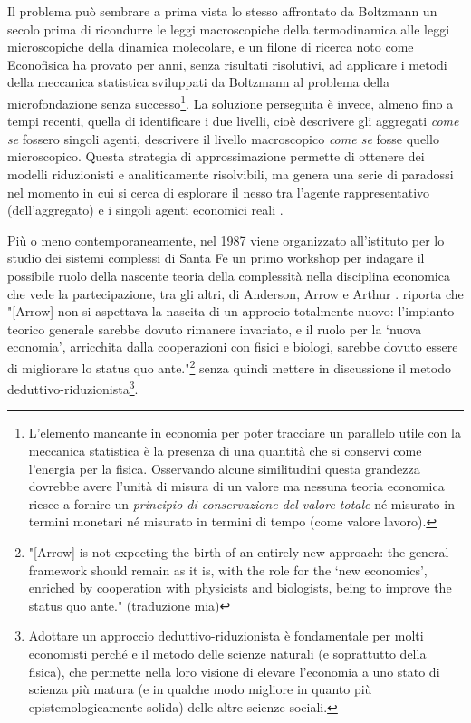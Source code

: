 \documentclass[a4paper, headings=standardclasses]{scrartcl}
\begin{document}
Il problema può sembrare a prima vista lo stesso affrontato da Boltzmann un secolo prima di ricondurre le leggi macroscopiche della termodinamica alle leggi microscopiche della dinamica molecolare, e un filone di ricerca noto come Econofisica ha provato per anni, senza risultati risolutivi, ad applicare i metodi della meccanica statistica sviluppati da Boltzmann al problema della microfondazione senza successo\footnote{L'elemento mancante in economia per poter tracciare un parallelo utile con la meccanica statistica è la presenza di una quantità che si conservi come l'energia per la fisica. Osservando alcune similitudini questa grandezza dovrebbe avere l'unità di misura di un valore ma nessuna teoria economica riesce a fornire un \textit{principio di conservazione del valore totale} né misurato in termini monetari né misurato in termini di tempo (come valore lavoro).}.
La soluzione perseguita è invece, almeno fino a tempi recenti, quella di identificare i due livelli, cioè descrivere gli aggregati \textit{come se} fossero singoli agenti, descrivere il livello macroscopico \textit{come se} fosse quello microscopico. Questa strategia di approssimazione permette di ottenere dei modelli riduzionisti e analiticamente risolvibili, ma genera una serie di paradossi nel momento in cui si cerca di esplorare il nesso tra l'agente rappresentativo (dell'aggregato) e i singoli agenti economici reali \parencite{kirman1992}.

Più o meno contemporaneamente, nel 1987 viene organizzato all'istituto per lo studio dei sistemi complessi di Santa Fe un primo workshop per indagare il possibile ruolo della nascente teoria della complessità nella disciplina economica che vede la partecipazione, tra gli altri, di Anderson, Arrow e Arthur \parencite{fontana2010a}.
\citeauthor{fontana2010a} riporta che "[Arrow] non si aspettava la nascita di un approcio totalmente nuovo: l'impianto teorico generale sarebbe dovuto rimanere invariato, e il ruolo per la `nuova economia', arricchita dalla cooperazioni con fisici e biologi, sarebbe dovuto essere di migliorare lo status quo ante."\footnote{"[Arrow] is not expecting the birth of an entirely new approach: the general framework should remain as it is, with the role for the `new economics', enriched by cooperation with physicists and biologists, being to improve the status quo ante." (traduzione mia)} \parencite{fontana2010a} senza quindi mettere in discussione il metodo deduttivo-riduzionista\footnote{Adottare un approccio deduttivo-riduzionista è fondamentale per molti economisti perché e il metodo delle scienze naturali (e soprattutto della fisica), che permette nella loro visione di elevare l'economia a uno stato di scienza più matura (e in qualche modo migliore in quanto più epistemologicamente solida) delle altre scienze sociali.}.
\end{document}
